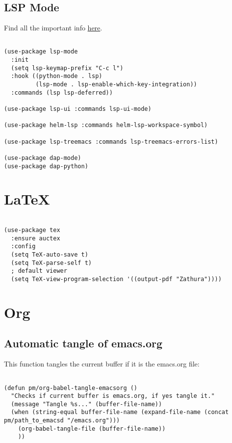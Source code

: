 \documentclass[11pt]{article}
\begin{document}
\subsection{LSP Mode}
\label{sec:orgc2ecc7b}

Find all the important info \href{https://emacs-lsp.github.io/lsp-mode/}{here}.

\begin{verbatim}

(use-package lsp-mode
  :init
  (setq lsp-keymap-prefix "C-c l")
  :hook ((python-mode . lsp)
		 (lsp-mode . lsp-enable-which-key-integration))
  :commands (lsp lsp-deferred))

(use-package lsp-ui :commands lsp-ui-mode)

(use-package helm-lsp :commands helm-lsp-workspace-symbol)

(use-package lsp-treemacs :commands lsp-treemacs-errors-list)

(use-package dap-mode)
(use-package dap-python)

\end{verbatim}

\section{\LaTeX{}}
\label{sec:org7252d38}

\begin{verbatim}

(use-package tex
  :ensure auctex
  :config
  (setq TeX-auto-save t)
  (setq TeX-parse-self t)
  ; default viewer
  (setq TeX-view-program-selection '((output-pdf "Zathura"))))

\end{verbatim}

\section{Org}
\label{sec:orgd1027f6}
\subsection{Automatic tangle of emacs.org}
\label{sec:org2caa157}

This function tangles the current buffer if it is the emacs.org file:
\begin{verbatim}

(defun pm/org-babel-tangle-emacsorg ()
  "Checks if current buffer is emacs.org, if yes tangle it."
  (message "Tangle %s..." (buffer-file-name))
  (when (string-equal buffer-file-name (expand-file-name (concat pm/path_to_emacsd "/emacs.org")))
	(org-babel-tangle-file (buffer-file-name))
	))

\end{verbatim}
\end{document}
